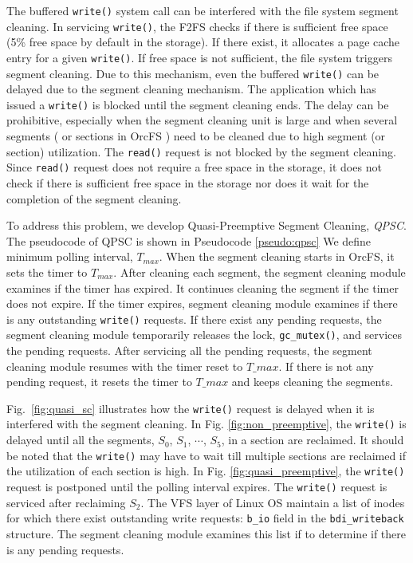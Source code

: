 \documentclass[pageno]{jpaper}
\begin{document}
The buffered \texttt{write()} system call can be interfered with the
file system segment cleaning. In servicing \texttt{write()}, the F2FS
checks if there is sufficient free space (5\% free space by default in
the storage). If there exist, it allocates a page cache entry for a
given \texttt{write()}. If free space is not sufficient, the
file system triggers segment cleaning. Due to this mechanism, even the
buffered \texttt{write()} can be delayed due to the segment cleaning
mechanism. The application which has issued a \texttt{write()} is
blocked until the segment cleaning ends. The delay can be prohibitive,
especially when the segment cleaning unit is large and when several
segments ( or sections in OrcFS ) need to be cleaned due to high
segment (or section) utilization. 
The \texttt{read()} request is not blocked by the segment cleaning. 
Since \texttt{read()} request does not require a free space in the storage, 
it does not check if there is sufficient free space in the storage nor does 
it wait for the completion of the segment cleaning.

To address this problem, we develop Quasi-Preemptive Segment Cleaning,
\emph{QPSC}. The pseudocode of QPSC is shown in Pseudocode
\ref{pseudo:qpsc} We define minimum polling interval, $T_{max}$. When
the segment cleaning starts in OrcFS, it sets the timer to
$T_{max}$. After cleaning each segment, the segment cleaning module
examines if the timer has expired. It continues cleaning the segment
if the timer does not expire. If the timer expires, segment cleaning
module examines if there is any outstanding \texttt{write()}
requests. If there exist any pending requests, the segment cleaning
module temporarily releases the lock, \texttt{gc\_mutex()}, and
services the pending requests. After servicing all the pending
requests, the segment cleaning module resumes with the timer reset to
$T\_{max}$. If there is not any pending request, it resets the timer
to $T\_{max}$ and keeps cleaning the segments.

Fig.~\ref{fig:quasi_sc} illustrates 
how the \texttt{write()} request is delayed when it is interfered with
the segment cleaning. In Fig. \ref{fig:non_preemptive}, the
\texttt{write()} is delayed until all the segments, $S_0$, $S_1$,
$\cdots$, $S_5$, in a section are reclaimed. It should be noted that the
\texttt{write()} may have to wait till multiple sections are reclaimed
if the utilization of each section is high. In Fig. \ref{fig:quasi_preemptive}, the \texttt{write()} request is postponed until
the polling interval expires. The \texttt{write()} request is serviced
after reclaiming $S_2$.  The VFS layer of Linux OS maintain a list of
inodes for which there exist outstanding write requests:
\texttt{b\_io} field in the \texttt{bdi\_writeback} structure. The
segment cleaning module examines this list if to determine if there is
any pending requests.
\end{document}
